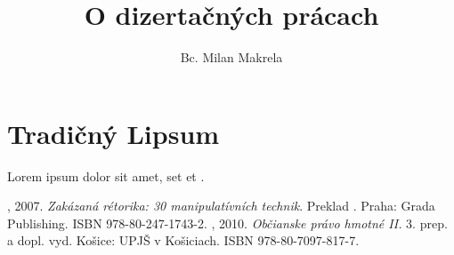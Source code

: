 \documentclass[thesismargins]{rnthesis}
\title{O dizertačných prácach}
\author{Bc. Milan Makrela}
\begin{document}
\maketitle
\newpage
\chapter{Tradičný Lipsum}
Lorem ipsum dolor sit amet, set \cite{beck07} et \cite{vojcik10}.

\begin{thebibliography}{9}
%
	, 2007. \emph{Zakázaná rétorika: 30 manipulatívních technik}. Preklad
. Praha: Grada Publishing. ISBN 978-80-247-1743-2.
	, 2010. \emph{Občianske právo hmotné II.} 3. prep. a dopl. vyd. Košice: UPJŠ v Košiciach. ISBN 978-80-7097-817-7.
\end{thebibliography}
\end{document}
